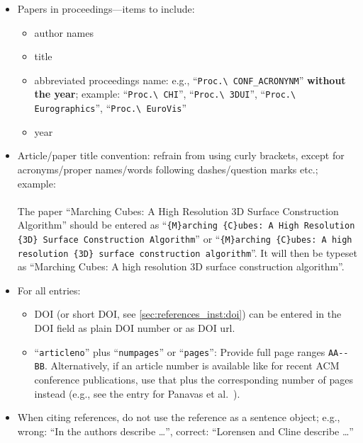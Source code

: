 \documentclass[journal]{vgtc}                     %
\begin{document}
\begin{itemize}
  \item Papers in proceedings---items to include:
        \begin{itemize}
  	      \item author names
  	      \item title
  	      \item abbreviated proceedings name: e.g., ``\texttt{Proc.\textbackslash{} CONF\_ACRONYNM}'' \textbf{without the year}; example: ``\texttt{Proc.\textbackslash{} CHI}'', ``\texttt{Proc.\textbackslash{} 3DUI}'', ``\texttt{Proc.\textbackslash{} Eurographics}'', ``\texttt{Proc.\textbackslash{} EuroVis}''
  	      \item year
        \end{itemize}

  \item Article/paper title convention: refrain from using curly brackets, except for acronyms/proper names/words following dashes/question marks etc.; example:\\\\
        The paper ``Marching Cubes: A High Resolution 3D Surface Construction Algorithm'' should be entered as ``\texttt{\{M\}arching \{C\}ubes: A High Resolution \{3D\} Surface Construction Algorithm}'' or  ``\texttt{\{M\}arching \{C\}ubes: A high resolution \{3D\} surface construction algorithm}''.
        It will then be typeset as ``Marching Cubes: A high resolution 3D surface construction algorithm''.
  \item For all entries:
        \begin{itemize}
  	      \item DOI (or short DOI, see \cref{sec:references_inst:doi}) can be entered in the DOI field as plain DOI number or as DOI url.
  	      \item ``\texttt{articleno}'' plus ``\texttt{numpages}'' or ``\texttt{pages}'': Provide full page ranges \texttt{AA-{}-BB}. Alternatively, if an article number is available like for recent ACM conference publications, use that plus the corresponding number of pages instead (e.g., see the entry for Panavas et al.\ \cite{Panavas2022JuvenileGraphicalPerception}).
        \end{itemize}
  \item When citing references, do not use the reference as a sentence object; e.g., wrong: ``In \cite{Lorensen1987MarchingCubesHigh} the authors describe \dots'', correct: ``Lorensen and Cline \cite{Lorensen1987MarchingCubesHigh} describe \dots''
\end{itemize}
\end{document}
